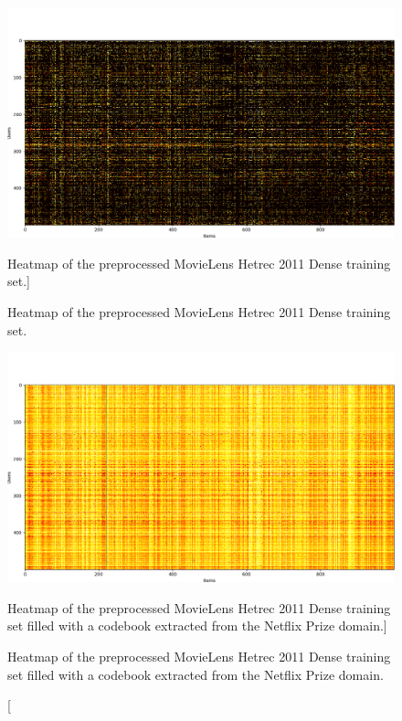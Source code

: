 \begin{figure}[htb]
\centering
\includegraphics[width=\textwidth]{pictures/movielens-target}
\caption
[Heatmap of the preprocessed MovieLens Hetrec 2011 Dense training set.]
{\protect\raggedright Heatmap of the preprocessed MovieLens Hetrec 2011 Dense training set.}
\includegraphics[width=\textwidth]{pictures/movielens-target-filled}
\caption
[Heatmap of the preprocessed MovieLens Hetrec 2011 Dense training set filled with a codebook extracted from the Netflix Prize domain.]
{\protect\raggedright Heatmap of the preprocessed MovieLens Hetrec 2011 Dense training set filled with a codebook extracted from the Netflix Prize domain.}
\end{figure}


